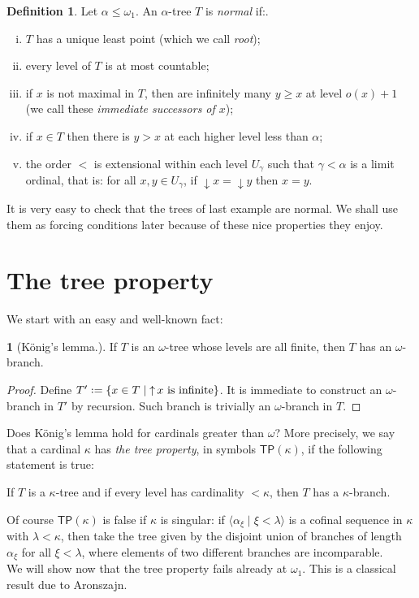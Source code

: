 \documentclass[12pt,a4paper]{report}
\theoremstyle{definition}
\newtheorem{defn}[theorem]{Definition}
\theoremstyle{num.custom-title}
\newtheorem{teo_custom-title}[theorem]{} %
\DeclareMathOperator{\height}{height}
\DeclareMathOperator{\down}{\downarrow}
\DeclareMathOperator{\up}{\uparrow}
\newcommand{\TP}{\ensuremath{\mathsf{TP}}\xspace}
\newcommand*{\defeq}{\mathrel{\rlap{%
                     \raisebox{0.3ex}{$\cdot$}}%
                     \raisebox{-0.3ex}{$\cdot$}}%
                     =}
\begin{document}
\begin{defn}
Let $\alpha \leq \omega_1$. An $\alpha$-tree $T$ is \emph{normal} if:.
\begin{enumerate}[(i)]\label{def-normal_tree}
\item $T$ has a unique least point (which we call \emph{root});
\item every level of $T$ is at most countable;
\item if $x$ is not maximal in $T$, then are infinitely many $y \geq x$ at level $o(x)+1$ (we call these \emph{immediate successors of $x$});
\item if $x \in T$ then there is $y>x$ at each higher level less than $\alpha$;
\item the order $<$ is extensional within each level $U_\gamma$ such that $\gamma < \alpha$ is a limit ordinal, that is: for all $x,y \in U_\gamma$, if $\down x = \down y$ then $x=y$.
\end{enumerate}
\end{defn}

It is very easy to check that the trees of last example are normal. We shall use them as forcing conditions later because of these nice properties they enjoy.

\section{The tree property}

We start with an easy and well-known fact:

\begin{teo_custom-title}[König's lemma.] If $T$ is an $\omega$-tree whose levels are all finite, then $T$ has an $\omega$-branch.
\begin{proof}
Define $T' \defeq \{x \in T \mid \up x \text{ is infinite}\}$. It is immediate to construct an $\omega$-branch in $T'$ by recursion. Such branch is trivially an $\omega$-branch in $T$.
\end{proof}
\end{teo_custom-title}

Does König's lemma hold for cardinals greater than $\omega$? More precisely, we say that a cardinal $\kappa$ has \emph{the tree property}, in symbols $\TP(\kappa)$, if the following statement is true:
\begin{center}
If $T$ is a $\kappa$-tree and if every level has cardinality $<\kappa$, then $T$ has a $\kappa$-branch.
\end{center}
%
Of course $\TP(\kappa)$ is false if $\kappa$ is singular: if $\langle \alpha_\xi \mid \xi < \lambda \rangle$ is a cofinal sequence in $\kappa$ with $\lambda < \kappa$, then take the tree given by the disjoint union of branches of length $\alpha_\xi$ for all $\xi < \lambda$, where elements of two different branches are incomparable.\\
We will show now that the tree property fails already at $\omega_1$. This is a classical result due to Aronszajn.
\end{document}
